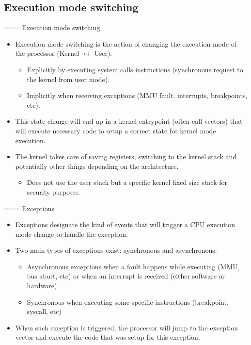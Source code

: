 

\subsection{Execution mode switching}

=== Execution mode switching
  \begin{itemize}
    \item Execution mode switching is the action of changing the execution
	    mode of the processor (Kernel $\leftrightarrow$ User).
    \begin{itemize}
      \item Explicitly by executing system calls instructions (synchronous
            request to the kernel from user mode).
      \item Implicitly when receiving exceptions (MMU fault, interrupts,
            breakpoints, etc).
    \end{itemize}
    \item This state change will end up in a kernel entrypoint (often call vectors)
          that will execute necessary code to setup a correct state for kernel
          mode execution.
    \item The kernel takes care of saving registers, switching to the kernel
          stack and potentially other things depending on the architecture.
    \begin{itemize}
      \item Does not use the user stack but a specific kernel fixed size stack
            for security purposes.
    \end{itemize}
  \end{itemize}


=== Exceptions
  \begin{itemize}
    \item Exceptions designate the kind of events that will trigger a CPU
          execution mode change to handle the exception.
    \item Two main types of exceptions exist: synchronous and asynchronous.
    \begin{itemize}
      \item Asynchronous exceptions when a fault happens while executing (MMU,
            bus abort, etc) or when an interrupt is received (either software
            or hardware).
      \item Synchronous when executing some specific instructions (breakpoint,
            syscall, etc)
    \end{itemize}
    \item When such exception is triggered, the processor will jump to the
          exception vector and execute the code that was setup for this
          exception.
  \end{itemize}


